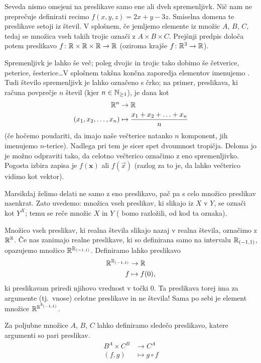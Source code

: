 Seveda nismo omejeni na preslikave samo ene ali dveh spremenljivk. Nič nam ne preprečuje definirati recimo $f(x, y, z) = 2x + y - 3z$. Smiselna domena te preslikave setoji iz  števil. V splošnem, če jemljemo elemente iz množic $A$, $B$, $C$, tedaj se množica vseh takih trojic označi z $A \times B \times C$. Prejšnji predpis določa potem preslikavo $f\colon \mathbb{R} \times \mathbb{R} \times \mathbb{R} \to \mathbb{R}$ (oziroma krajše $f\colon \mathbb{R}^3 \to \mathbb{R}$).

Spremenljivk je lahko še več; poleg dvojic in trojic tako dobimo še četverice, peterice, šesterice\ldots V splošnem takšna končna zaporedja elementov imenujemo . Tudi število spremenljivk je lahko označeno s črko; na primer, preslikava, ki računa povprečje $n$ števil (kjer $n \in \mathbb{N}_{\geq 1}$), je dana kot
\begin{align*}
\mathbb{R}^n &\to \mathbb{R} \\
(x_1, x_2, \ldots, x_n) &\mapsto \frac{x_1 + x_2 + \ldots + x_n}{n}
\end{align*}
(če hočemo poudariti, da imajo naše večterice natanko $n$ komponent, jih imenujemo $n$-terice). Nadlega pri tem je sicer spet dvoumnost tropičja. Deloma jo je možno odpraviti tako, da celotno večterico označimo z eno spremenljivko. Pogosta izbira zapisa je $f(\mathbf{x})$ ali $f(\vec{x})$ (razlog za to je, da lahko večterico vidimo kot vektor).

Marsikdaj želimo delati ne samo z eno preslikavo, pač pa s celo množico preslikav naenkrat. Zato uvedemo: množica vseh preslikav, ki slikajo iz $X$ v $Y$, se označi kot $Y^X$; temu se reče  množic $X$ in $Y$ ( bomo razložili, od kod ta oznaka).

\begin{zgled}
Množico vseh preslikav, ki realna števila slikajo nazaj v realna števila, označimo z $\mathbb{R}^{\mathbb{R}}$. Če nas zanimajo realne preslikave, ki so definirana samo na intervalu ${\mathbb{R}}_{(-1, 1)}$, opazujemo množico $\mathbb{R}^{{\mathbb{R}}_{(-1, 1)}}$. Definiramo lahko preslikavo
\begin{align*}
\mathbb{R}^{{\mathbb{R}}_{(-1, 1)}} &\to \mathbb{R} \\
f &\mapsto f(0),
\end{align*}
ki preslikavam priredi njihovo vrednost v točki $0$. Ta preslikava torej ima za argumente (tj.~vnose) celotne preslikave in ne števila! Sama po sebi je element množice $\mathbb{R}^{\mathbb{R}^{{\mathbb{R}}_{(-1, 1)}}}$.
\end{zgled}

\begin{zgled}
Za poljubne množice $A$, $B$, $C$ lahko definiramo sledečo preslikavo, katere argumenti so pari preslikav.
\begin{align*}
B^A \times C^B &\to C^A \\
(f, g) &\mapsto g \circ f
\end{align*}
\end{zgled}


